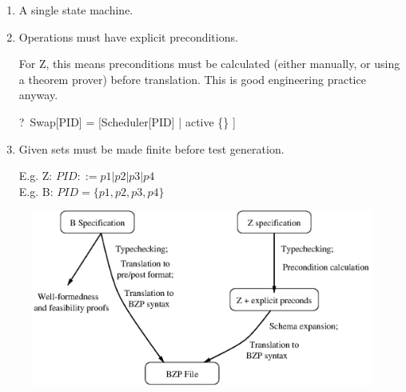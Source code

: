 \begin{slide}

\begin{enumerate}
\item A single state machine.

\item Operations must have explicit preconditions.

  For Z, this means preconditions must be calculated
  (either manually, or using a theorem prover) before translation.
  This is good engineering practice anyway.

\begin{zed}
   \vdash ?\ \pre Swap[PID] = [Scheduler[PID] | active \neq \{\} ] 
\end{zed}

\item Given sets must be made finite before test generation.

  E.g. Z:  $PID ::= p1 | p2 | p3 | p4$ \\
  E.g. B:  $PID = \{p1, p2, p3, p4\}$
\end{enumerate}
\end{slide}



\begin{slide}
\medskip
\begin{figure}
  \includegraphics[width=\textwidth]{translation}
  \label{fig:translation}
\end{figure}
\end{slide}



